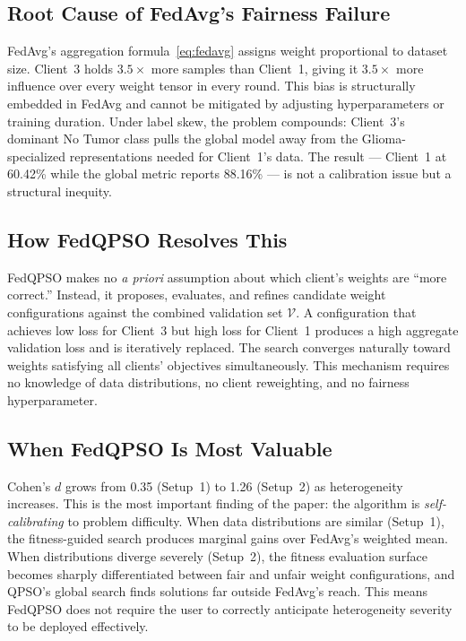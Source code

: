 \documentclass[conference]{IEEEtran}
\begin{document}
\subsection{Root Cause of FedAvg's Fairness Failure}
FedAvg's aggregation formula~\eqref{eq:fedavg} assigns weight proportional
to dataset size. Client~3 holds $3.5\times$ more samples than Client~1,
giving it $3.5\times$ more influence over every weight tensor in every
round. This bias is structurally embedded in FedAvg and cannot be mitigated
by adjusting hyperparameters or training duration. Under label skew, the
problem compounds: Client~3's dominant No Tumor class pulls the global model
away from the Glioma-specialized representations needed for Client~1's data.
The result — Client~1 at 60.42\% while the global metric reports 88.16\%
— is not a calibration issue but a structural inequity.

\subsection{How FedQPSO Resolves This}
FedQPSO makes no \emph{a priori} assumption about which client's weights are
``more correct.'' Instead, it proposes, evaluates, and refines candidate
weight configurations against the combined validation set $\mathcal{V}$.
A configuration that achieves low loss for Client~3 but high loss for
Client~1 produces a high aggregate validation loss and is iteratively
replaced. The search converges naturally toward weights satisfying all
clients' objectives simultaneously. This mechanism requires no knowledge
of data distributions, no client reweighting, and no fairness hyperparameter.

\subsection{When FedQPSO Is Most Valuable}
Cohen's $d$ grows from 0.35 (Setup~1) to 1.26 (Setup~2) as heterogeneity
increases. This is the most important finding of the paper: the algorithm
is \emph{self-calibrating} to problem difficulty. When data distributions
are similar (Setup~1), the fitness-guided search produces marginal gains
over FedAvg's weighted mean. When distributions diverge severely (Setup~2),
the fitness evaluation surface becomes sharply differentiated between fair
and unfair weight configurations, and QPSO's global search finds solutions
far outside FedAvg's reach. This means FedQPSO does not require the user
to correctly anticipate heterogeneity severity to be deployed effectively.
\end{document}

